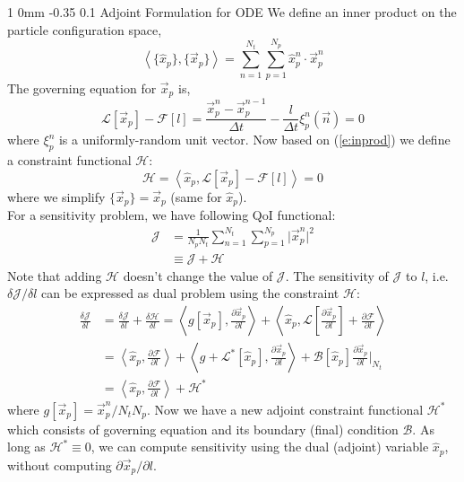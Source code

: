 \documentclass[11pt]{article}
\makeatletter
\renewcommand{\subsection}{\@startsection
{subsection}%
{1}%
{0mm}%
{-0.35\baselineskip}%
{0.1\baselineskip}%
{\normalfont\large\bfseries\color{brown}}}%
\def\Dpartial#1#2{ \frac{\partial #1}{\partial #2} }
\def\Del#1#2{ \frac{\delta #1}{\delta #2} }
\newcommand{\vn}{\vec{n}}
\newcommand{\xp}{\vec{x}_p}
\newcommand{\Dt}{\Delta t}
\newcommand{\xph}{\hat{x}_p}
\newcommand{\inprod}[2]{\left\langle#1,#2\right\rangle}
\newcommand{\cH}{\mathcal{H}}
\newcommand{\cJ}{\mathcal{J}}
\newcommand{\cL}{\mathcal{L}}
\newcommand{\cF}{\mathcal{F}}
\newcommand{\cB}{\mathcal{B}}
\makeatother
\begin{document}
\appendix
\subsection{Adjoint Formulation for ODE}
\label{app1}
We define an inner product on the particle configuration space,
\begin{equation}
\inprod{\{\xph\}}{\{\xp\}} = \sum_{n=1}^{N_t}\sum_{p=1}^{N_p}\xph^n\cdot\xp^n
\label{e:inprod}
\end{equation}
The governing equation for $\xp$ is,
\begin{equation}
\cL[\xp] - \cF[l] = \frac{\xp^{n} - \xp^{n-1}}{\Dt} - \frac{l}{\Dt}\xi_p^n(\vn) = 0
\end{equation}
where $\xi_p^n$ is a uniformly-random unit vector.
Now based on (\ref{e:inprod}) we define a constraint functional $\cH$:
\begin{equation}
\cH = \inprod{\xph}{\cL[\xp] - \cF[l]} = 0
\label{e:H1}
\end{equation}
where we simplify $\{\xp\} = \xp$ (same for $\xph$).\\
For a sensitivity problem, we have following QoI functional:
\begin{equation}
\begin{split}
\cJ &= \frac{1}{N_pN_t}\sum_{n=1}^{N_t}\sum_{p=1}^{N_p}\vert \xp^n\vert^2\\
&\equiv \cJ + \cH
\label{e:J1}
\end{split}
\end{equation}
Note that adding $\cH$ doesn't change the value of $\cJ$.
The sensitivity of $\cJ$ to $l$, i.e. $\delta\cJ/\delta l$ can be expressed as dual problem using the constraint $\cH$:
\begin{equation}
\begin{split}
\Del{\cJ}{l} &= \Del{\cJ}{l} + \Del{\cH}{l} = \inprod{g[\xp]}{\Dpartial{\xp}{l}} + \inprod{\xph}{\cL\left[\Dpartial{\xp}{l}\right] + \Dpartial{\cF}{l}}\\
&= \inprod{\xph}{\Dpartial{\cF}{l}} + \inprod{g+\cL^*[\xph]}{\Dpartial{\xp}{l}} + \cB[\xph]\Dpartial{\xp}{l}\bigg|_{N_t}\\
&= \inprod{\xph}{\Dpartial{\cF}{l}} + \cH^*
\end{split}
\end{equation}
where $g[\xp] = \xp^n/N_tN_p$.
Now we have a new adjoint constraint functional $\cH^*$ which consists of governing equation and its boundary (final) condition $\cB$.
As long as $\cH^*\equiv0$, we can compute sensitivity using the dual (adjoint) variable $\xph$,
without computing $\partial \xp/\partial l$.
\end{document}
